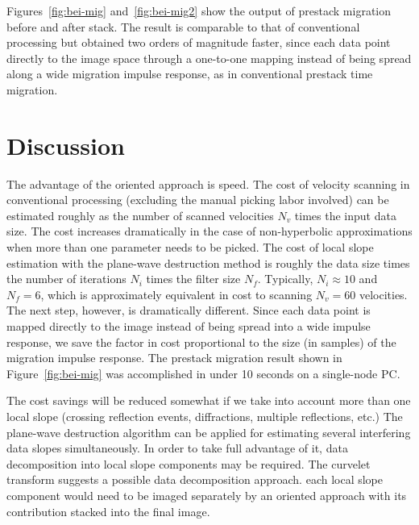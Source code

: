 Figures~\ref{fig:bei-mig} and~\ref{fig:bei-mig2} show the output of
prestack migration before and after stack. The result is comparable to
that of conventional processing \cite[]{bei} but obtained two orders
of magnitude faster, since each data point 
 directly to the image space through a one-to-one
mapping instead of being spread along a wide migration impulse
response, as in  conventional prestack time migration.



\section{Discussion}

The   advantage of the oriented approach is
speed. The cost of velocity scanning in conventional processing
(excluding the manual picking labor involved) can be estimated roughly
as the number of scanned velocities $N_v$ times the input data
size. The cost increases dramatically in the case of non-hyperbolic
approximations when more than one parameter needs to be picked.  The
cost of local slope estimation with the plane-wave destruction method
is roughly the data size times the number of iterations $N_i$ times
the filter size $N_f$. Typically, $N_i \approx 10$ and $N_f = 6$,
which is approximately equivalent in cost to scanning $N_v=60$
velocities. The next step, however, is dramatically different. Since
each data point is mapped directly to the image instead of being
spread into a wide impulse response, we save the factor in cost
proportional to the size (in samples) of the migration impulse
response.  The prestack migration result shown in
Figure~\ref{fig:bei-mig} was accomplished in under 10 seconds on a
single-node PC.

The cost savings will be reduced somewhat if we take into account more
than one local slope (crossing reflection events, diffractions,
multiple reflections, etc.) The plane-wave destruction algorithm
\cite[]{GEO67-06-19461960} can be applied for estimating several
interfering data slopes simultaneously. In order to take full
advantage of it, data decomposition into local slope components may be
required. The curvelet transform \cite[]{SEG-2003-09971000,huub}
suggests a possible data decomposition approach.  each local
slope component would need to be imaged separately by an oriented
approach with its contribution stacked into the final image.

